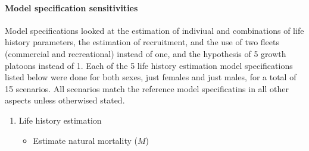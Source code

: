\documentclass[11pt,
  english,
  a4paper,
]{article}
\begin{document}
\leavevmode\tagmcend\tagstructend\par


\hypertarget{model-specification-sensitivities}{%
\paragraph{Model specification sensitivities}\label{model-specification-sensitivities}}

\leavevmode\tagmcend\tagstructend


Model specifications looked at the estimation of indiviual and combinations of life history parameters, the estimation of recruitment, and the use of two fleets (commercial and recreational) instead of one, and the hypothesis of 5 growth platoons instead of 1. Each of the 5 life history estimation model specifications listed below were done for both sexes, just females and just males, for a total of 15 scenarios. All scenarios match the reference model specificatins in all other aspects unless otherwised stated.

\leavevmode\tagmcend\tagstructend\par


\begin{enumerate}
\def\labelenumi{\arabic{enumi}.}
\item

  Life history estimation

  \tagmcend\tagstructend\tagstructend


  \begin{itemize}
  \item


    Estimate natural mortality ({\(M\)\leavevmode\tagmcend\tagstructend})

    \tagmcend\tagstructend\tagstructend

    \tagmcend\tagstructend\tagstructend
  \end{itemize}

  \tagstructend
\end{enumerate}
\end{document}
